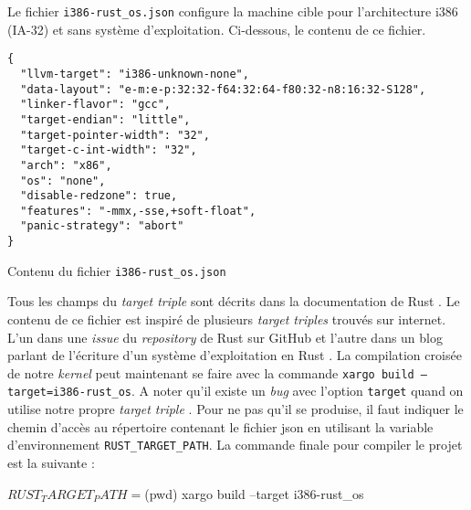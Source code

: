  \bigbreak

Le fichier \texttt{i386-rust_os.json} configure la machine cible
pour l'architecture i386 (\acrshort{IA-32}) et sans système d'exploitation.
Ci-dessous, le contenu de ce fichier. \\

\begin{code}
\begin{verbatim}
{
  "llvm-target": "i386-unknown-none",
  "data-layout": "e-m:e-p:32:32-f64:32:64-f80:32-n8:16:32-S128",
  "linker-flavor": "gcc",
  "target-endian": "little",
  "target-pointer-width": "32",
  "target-c-int-width": "32",
  "arch": "x86",
  "os": "none",
  "disable-redzone": true,
  "features": "-mmx,-sse,+soft-float",
  "panic-strategy": "abort"
}
\end{verbatim}
\caption{Contenu du fichier \texttt{i386-rust_os.json}}
\label{lst:rust:target}
\end{code} \bigbreak

Tous les champs du \textit{target triple} sont décrits dans la documentation de
Rust \cite{ref4}. Le contenu de ce fichier est inspiré de plusieurs \textit{target triples}
trouvés sur internet. L'un dans une \textit{issue} du \textit{repository}
de Rust sur GitHub \cite{ref5} et l'autre dans un blog parlant de l'écriture
d'un système d'exploitation en Rust \cite{ref8}. La compilation croisée de notre
\textit{kernel} peut maintenant se faire avec la commande
\texttt{xargo build --target=i386-rust_os}. A noter qu'il existe un
\textit{bug} avec l'option \texttt{target} quand on utilise notre propre
\textit{target triple} \cite{ref7}. Pour ne pas qu'il se produise, il faut indiquer
le chemin d'accès au répertoire contenant le fichier \acrshort{json} en utilisant
la variable d'environnement \texttt{RUST_TARGET_PATH}. La commande finale
pour compiler le projet est la suivante :

\begin{shellcode}
$ RUST_TARGET_PATH=$(pwd) xargo build --target i386-rust_os
\end{shellcode}


